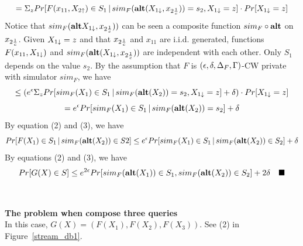 \documentclass[11pt]{article}
\begin{document}
\[
=\Sigma_{z} Pr[ F(x_{11}, X_{2 \uparrow}) \in S_{1}\,|\,sim_{F}({\bf alt}(X_{1 \downarrow}, x_{2 \frac{1}{c}})) = s_{2}, X_{1 \downarrow} =z] \cdot Pr[X_{1 \downarrow}=z]
\]
Notice that $sim_{F}({\bf alt}X_{1 \downarrow}, x_{2 \frac{1}{c}}))$ can be seen a composite function $sim_{F} \circ {\bf alt}$ on $x_{2 \frac{1}{c}}$. Given $X_{1 \downarrow}=z$ and  that $x_{2 \frac{1}{c}}$ and $x_{11}$ are i.i.d. generated, functions $F(x_{11}, X_{1 \downarrow})$ and $sim_{F}({\bf alt}(X_{1 \downarrow}, x_{2 \frac{1}{c}}))$ are independent with each other. Only $S_{1}$ depends on the value $s_{2}$. By the assumption that $F$ is $(\epsilon, \delta, \Delta_{F}, \Gamma)$-CW private with simulator $sim_{F}$, we have
\[
\leq (e^{\epsilon} \Sigma_{z} Pr[ sim_{F}(X_{1}) \in S_{1}\,|\,sim_{F}({\bf alt}(X_{2})) = s_{2},X_{1 \downarrow} =z]+\delta) \cdot Pr[X_{1 \downarrow}=z]
\]
\[
=e^{\epsilon} Pr[ sim_{F}(X_{1}) \in S_{1}\,|\,sim_{F}({\bf alt}(X_{2})) = s_{2}]+\delta
\]
By equation (2) and (3), we have
\begin{equation}
Pr[ F(X_{1}) \in S_{1}\,|\,sim_{F}({\bf alt}(X_{2})) \in S{2}] \leq e^{\epsilon} Pr[ sim_{F}(X_{1}) \in S_{1}\,|\,sim_{F}({\bf alt}(X_{2})) \in S_{2}]+\delta
\end{equation}
By equations (2) and (3), we have
\[
Pr[G(X) \in S] \leq e^{2\epsilon} Pr[sim_{F} ({\bf alt}(X_{1})) \in S_{1} , sim_{F} ({\bf alt}(X_{2})) \in S_{2}] + 2\delta \quad \blacksquare
\]
\\
\\
{\bf The problem when compose three queries}\\
In this case, $G(X) = (F(X_{1}) , F(X_{2}), F(X_{3}))$. See (2) in Figure~\ref{stream_db1}. 
\end{document}
